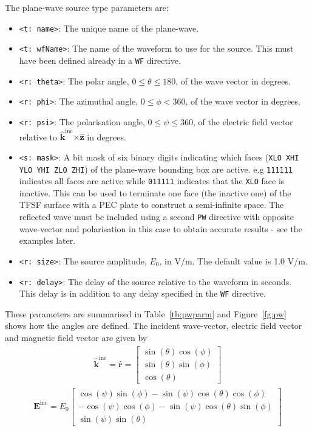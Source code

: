 \documentclass[onecolumn,a4paper]{article}
\numberwithin{equation}{section}
\begin{document}
The plane-wave source type parameters are:
\begin{itemize}
 \item \texttt{<t:~name>}: The unique name of the plane-wave.
 \item \texttt{<t:~wfName>}: The name of the waveform to use for the source. 
 This must have been defined already in a \texttt{WF} directive.
 \item \texttt{<r:~theta>}: The polar angle, $0 \le \theta \le 180$, of the wave vector in degrees.
 \item \texttt{<r:~phi>}: The azimuthal angle, $0 \le \phi < 360$, of the wave vector in degrees.
 \item \texttt{<r:~psi>}: The polarisation angle, $0 \le \psi \le 360$, of the electric field vector relative
 to $\hat{\mathbf{k}}^\mathrm{inc} \mathbf{\times} \hat{\mathbf{z}}$ in degrees.
 \item \texttt{<s:~mask>}: A bit mask of six binary digits indicating which faces
 (\texttt{XLO XHI YLO YHI ZLO ZHI}) of the plane-wave bounding box are active. e.g \texttt{111111}
 indicates all faces are active while \texttt{011111} indicates that the \texttt{XLO} face is inactive. 
 This can be used to terminate one face (the inactive one) of the TFSF surface with a PEC plate to
 construct a semi-infinite space. The reflected wave must be included using a second \texttt{PW}
 directive with opposite wave-vector and polarisation in this case to obtain accurate results - see the examples later.
 \item \texttt{<r:~size>}: The source amplitude, $E_0$, in V/m. The default 
 value is 1.0 V/m. 
 \item \texttt{<r:~delay>}: The delay of the source relative to the waveform in seconds. This
 delay is in addition to any delay specified in the \texttt{WF} directive.
\end{itemize}
These parameters are summarised in Table~\ref{tb:pwparm} and Figure~\ref{fg:pw} shows how the angles are 
defined. The incident wave-vector, electric field vector and magnetic field vector are given by 
\begin{eqnarray}
\hat{\mathbf{k}}^\mathrm{inc} = \hat{\mathbf{r}}
=  \left[
\begin{array}{c}
\sin( \theta ) \cos( \phi ) \\
\sin( \theta ) \sin( \phi ) \\
\cos( \theta )
\end{array}
\right]
\label{eq:kinc}
\end{eqnarray}
\begin{eqnarray}
\mathbf{E}^\mathrm{inc}
= E_0 \left[
\begin{array}{c}
 \cos( \psi ) \sin( \phi ) - \sin( \psi ) \cos( \theta ) \cos( \phi ) \\
-\cos( \psi ) \cos( \phi ) - \sin( \psi ) \cos( \theta ) \sin( \phi ) \\
 \sin( \psi ) \sin( \theta )
\end{array}
\right]
\label{eq:Einc}
\end{eqnarray}
\end{document}
